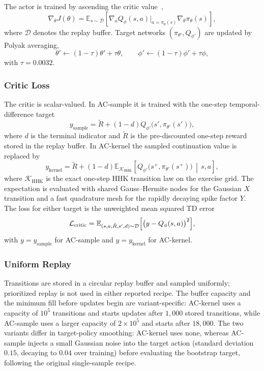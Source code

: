 \documentclass[a4paper,fleqn]{cas-dc}
\begin{document}
The actor is trained by ascending the critic value~\cite{silver2014dpg},
\[
    \nabla_\theta J(\theta)
    =
    \mathbb{E}_{s \sim \mathcal{D}}
    \left[
        \nabla_a Q_\phi(s,a)\big|_{a=\pi_\theta(s)}
        \nabla_\theta \pi_\theta(s)
        \right],
\]
where $\mathcal{D}$ denotes the replay buffer. Target networks $(\pi_{\theta'},Q_{\phi'})$ are updated by Polyak averaging,
\[
    \theta' \leftarrow (1-\tau)\theta' + \tau \theta,
    \qquad
    \phi' \leftarrow (1-\tau)\phi' + \tau \phi,
\]
with $\tau = 0.0032$.

\subsubsection{Critic Loss}

The critic is scalar-valued. In AC-sample it is trained with the one-step temporal-difference target
\[
    y_{\mathrm{sample}} = \tilde R + (1-d) Q_{\phi'}\bigl(s',\pi_{\theta'}(s')\bigr),
\]
where $d$ is the terminal indicator and $\tilde R$ is the pre-discounted one-step reward stored in the replay buffer. In AC-kernel the sampled continuation value is replaced by
\[
    y_{\mathrm{kernel}} =
    \tilde R
    + (1-d)
      \mathbb{E}_{\mathcal{K}_{\mathrm{HHK}}}
      \!\left[
          Q_{\phi'}\bigl(s^+,\pi_{\theta'}(s^+)\bigr)
          \,\middle|\, s,a
      \right],
\]
where $\mathcal{K}_{\mathrm{HHK}}$ is the exact one-step HHK transition law on the exercise grid. The expectation is evaluated with shared Gauss--Hermite nodes for the Gaussian $X$ transition and a fast quadrature mesh for the rapidly decaying spike factor $Y$. The loss for either target is the unweighted mean squared TD error
\begin{equation*}
    \mathcal{L}_{\mathrm{critic}}
    =
    \mathbb{E}_{(s,a,\tilde R,s',d) \sim \mathcal{D}}
    \Bigl[
        \bigl(y - Q_\phi(s,a)\bigr)^2
        \Bigr],
\end{equation*}
with $y=y_{\mathrm{sample}}$ for AC-sample and $y=y_{\mathrm{kernel}}$ for AC-kernel.

\subsubsection{Uniform Replay}

Transitions are stored in a circular replay buffer and sampled uniformly; prioritized replay is not used in either reported recipe. The buffer capacity and the minimum fill before updates begin are variant-specific: AC-kernel uses a capacity of $10^5$ transitions and starts updates after $1{,}000$ stored transitions, while AC-sample uses a larger capacity of $2\times10^5$ and starts after $18{,}000$. The two variants differ in target-policy smoothing: AC-kernel uses none, whereas AC-sample injects a small Gaussian noise into the target action (standard deviation $0.15$, decaying to $0.04$ over training) before evaluating the bootstrap target, following the original single-sample recipe.
\end{document}
